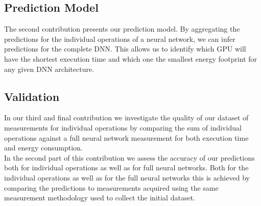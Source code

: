 
\subsection{Prediction Model}
The second contribution presents our prediction model. By aggregating the predictions for the individual operations of a neural network, we can infer predictions for the complete DNN. This allows us to identify which GPU will have the shortest execution time and which one the smallest energy footprint for any given DNN architecture. 



\subsection{Validation}
In our third and final contribution we investigate the quality of our dataset of
measurements for individual operations by comparing the sum of individual operations
against a full neural network measurement for both execution time and energy consumption.\\
In the second part of this contribution we assess the accuracy of our predictions
both for individual operations as well as for full neural networks. Both for the
individual operations as well as for the full neural networks this is achieved by
comparing the predictions to measurements acquired using the same measurement
methodology used to collect the initial dataset.






% 

% 

